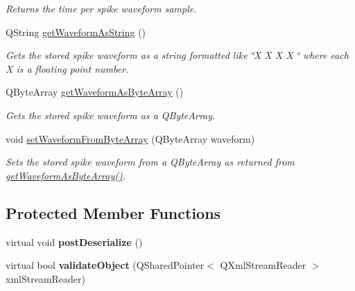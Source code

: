 \begin{DoxyCompactItemize}
\begin{DoxyCompactList}\small\item\em Returns the time per spike waveform sample. \end{DoxyCompactList}\item 
\hypertarget{class_picto_1_1_neural_data_unit_a53b6c6c148424672962753be0d1809de}{Q\-String \hyperlink{class_picto_1_1_neural_data_unit_a53b6c6c148424672962753be0d1809de}{get\-Waveform\-As\-String} ()}\label{class_picto_1_1_neural_data_unit_a53b6c6c148424672962753be0d1809de}

\begin{DoxyCompactList}\small\item\em Gets the stored spike waveform as a string formatted like \char`\"{}\-X X X X \char`\"{} where each X is a floating point number. \end{DoxyCompactList}\item 
\hypertarget{class_picto_1_1_neural_data_unit_a07e3b5225fe3c5bf19d31971754de81d}{Q\-Byte\-Array \hyperlink{class_picto_1_1_neural_data_unit_a07e3b5225fe3c5bf19d31971754de81d}{get\-Waveform\-As\-Byte\-Array} ()}\label{class_picto_1_1_neural_data_unit_a07e3b5225fe3c5bf19d31971754de81d}

\begin{DoxyCompactList}\small\item\em Gets the stored spike waveform as a Q\-Byte\-Array. \end{DoxyCompactList}\item 
\hypertarget{class_picto_1_1_neural_data_unit_ae6df02132d7b4886d90638447ef1d898}{void \hyperlink{class_picto_1_1_neural_data_unit_ae6df02132d7b4886d90638447ef1d898}{set\-Waveform\-From\-Byte\-Array} (Q\-Byte\-Array waveform)}\label{class_picto_1_1_neural_data_unit_ae6df02132d7b4886d90638447ef1d898}

\begin{DoxyCompactList}\small\item\em Sets the stored spike waveform from a Q\-Byte\-Array as returned from \hyperlink{class_picto_1_1_neural_data_unit_a07e3b5225fe3c5bf19d31971754de81d}{get\-Waveform\-As\-Byte\-Array()}. \end{DoxyCompactList}\end{DoxyCompactItemize}
\subsection*{Protected Member Functions}
\begin{DoxyCompactItemize}
\item 
\hypertarget{class_picto_1_1_neural_data_unit_a5398f2c4cda8846d15f3dc04aa58ab84}{virtual void {\bfseries post\-Deserialize} ()}\label{class_picto_1_1_neural_data_unit_a5398f2c4cda8846d15f3dc04aa58ab84}

\item 
\hypertarget{class_picto_1_1_neural_data_unit_a613ed332db3a9dfa2311e92476142b3f}{virtual bool {\bfseries validate\-Object} (Q\-Shared\-Pointer$<$ Q\-Xml\-Stream\-Reader $>$ xml\-Stream\-Reader)}\label{class_picto_1_1_neural_data_unit_a613ed332db3a9dfa2311e92476142b3f}

\end{DoxyCompactItemize}
